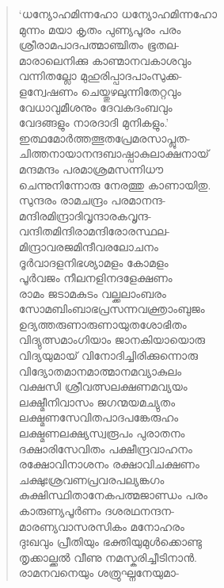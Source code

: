 \begin{verse}
‘ധന്യോഹമിന്നഹോ ധന്യോഹമിന്നഹോ\\
മുന്നം മയാ കൃതം പുണ്യപൂരം പരം\\
ശ്രീരാമപാദപത്മാഞ്ചിതം ഭൂതല-\\
മാരാലെനിക്കു കാണ്മാനവകാശവും\\
വന്നിതല്ലോ മുഹുരിപ്പാദപാംസുക്ക-\\
ളന്വേഷണം ചെയ്തുഴലുന്നിതേറ്റവും\\
വേധാവുമീശനും ദേവകദംബവും\\
വേദങ്ങളും നാരദാദി മുനികളും.’\\
ഇത്ഥമോര്‍ത്തത്ഭുതപ്രേമരസാപ്ലുത-\\
ചിത്തനായാനന്ദബാഷ്പാകുലാക്ഷനായ്\\
മന്ദമന്ദം പരമാശ്രമസന്നിധൗ\\
ചെന്നുനിന്നോരു നേരത്തു കാണായിതു.\\
സുന്ദരം രാമചന്ദ്രം പരമാനന്ദ-\\
മന്ദിരമിന്ദ്രാദിവൃന്ദാരകവൃന്ദ-\\
വന്ദിതമിന്ദിരാമന്ദിരോരസ്ഥല-\\
മിന്ദ്രാവരജമിന്ദീവരലോചനം\\
ദൂര്‍വാദളനിഭശ്യാമളം കോമളം\\
പൂര്‍വജം നീലനളിനദളേക്ഷണം\\
രാമം ജടാമകുടം വല്ക്കലാംബരം\\
സോമബിംബാഭപ്രസന്നവക്ത്രാംബുജം\\
ഉദ്യത്തരുണാരുണായുതശോഭിതം\\
വിദ്യുത്സമാംഗിയാം ജാനകിയായൊരു\\
വിദ്യയുമായ് വിനോദിച്ചിരിക്കുന്നൊരു\\
വിദ്യോതമാനമാത്മാനമവ്യാകുലം\\
വക്ഷസി ശ്രീവത്സലക്ഷണമവ്യയം\\
ലക്ഷ്മീനിവാസം ജഗന്മയമച്യുതം\\
ലക്ഷ്മണസേവിതപാദപങ്കേരുഹം\\
ലക്ഷ്മണലക്ഷ്യസ്വരൂപം പുരാതനം\\
ദക്ഷാരിസേവിതം പക്ഷീന്ദ്രവാഹനം\\
രക്ഷോവിനാശനം രക്ഷാവിചക്ഷണം\\
ചക്ഷുഃശ്രവണപ്രവരപല്യങ്കഗം\\
കുക്ഷിസ്ഥിതാനേകപത്മജാണ്ഡം പരം\\
കാരുണ്യപൂര്‍ണം ദശരഥനന്ദന-\\
മാരണ്യവാസരസികം മനോഹരം\\
ദുഃഖവും പ്രീതിയും ഭക്തിയുമുള്‍ക്കൊണ്ടു\\
തൃക്കാല്ക്കല്‍ വീണു നമസ്കരിച്ചീടിനാന്‍.\\
രാമനവനെയും ശത്രുഘ്നനേയുമാ-\\

\end{verse}
